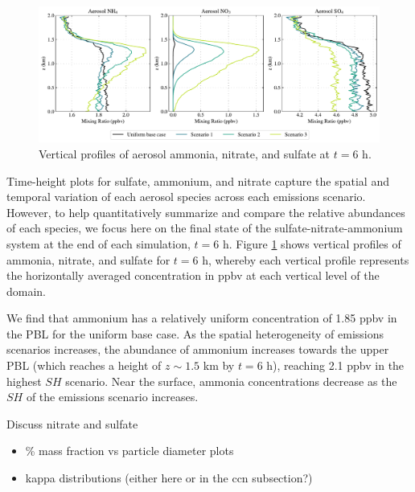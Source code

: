 
\begin{figure}[!t]
  \centering
    \includegraphics[width=\textwidth]{figures/chapter5/aerosol-SNA-vertical-profiles-time36.pdf}
    \caption{Vertical profiles of aerosol ammonia, nitrate, and sulfate at $t=6$ h.}
    \label{fig:sna-vertical-profile}
\end{figure}

Time-height plots for sulfate, ammonium, and nitrate capture the spatial and temporal variation of each aerosol species across each emissions scenario. However, to help quantitatively summarize and compare the relative abundances of each species, we focus here on the final state of the sulfate-nitrate-ammonium system at the end of each simulation, $t=6$ h. Figure \ref{fig:sna-vertical-profile} shows vertical profiles of ammonia, nitrate, and sulfate for $t=6$ h, whereby each vertical profile represents the horizontally averaged concentration in ppbv at each vertical level of the domain.

We find that ammonium has a relatively uniform concentration of 1.85 ppbv in the PBL for the uniform base case. As the spatial heterogeneity of emissions scenarios increases, the abundance of ammonium increases towards the upper PBL (which reaches a height of $z\sim1.5$ km by $t=6$ h), reaching 2.1 ppbv in the highest $SH$ scenario. Near the surface, ammonia concentrations decrease as the $SH$ of the emissions scenario increases. 

Discuss nitrate and sulfate  

\begin{itemize}
\item \% mass fraction vs particle diameter plots
\item kappa distributions (either here or in the ccn subsection?)
\end{itemize}

